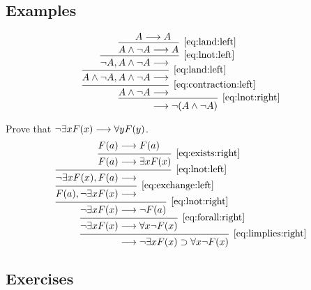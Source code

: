 \documentclass[11pt,a4paper]{article}
\begin{document}
\subsection{Examples}

\begin{example}[A proof in \LJ]\label{exa:a proof in LJ}
    \begin{equation*}
        \begin{prooftree}
            \hypo{A\seq A}
            \infer1[\eqref{eq:land:left}]{A\land\lnot A&\seq A}
            \infer1[\eqref{eq:lnot:left}]{\lnot A, A\land\lnot A&\seq}
            \infer1[\eqref{eq:land:left}]{A\land\lnot A, A\land\lnot A&\seq}
            \infer1[\eqref{eq:contraction:left}]{A\land\lnot A&\seq}
            \infer1[\eqref{eq:lnot:right}]{&\seq \lnot\arcs{A\land\lnot A}}
        \end{prooftree}
    \end{equation*}
\end{example}

\begin{example}\label{exa:another proof in LJ}
    Prove that \(\lnot\exists xF(x)\longrightarrow\forall yF(y)\).
    \begin{equation*}
        \begin{prooftree}
            \hypo{F(a)&\seq F(a)}
            \infer1[\eqref{eq:exists:right}]{F(a)&\seq\exists xF(x)}
            \infer1[\eqref{eq:lnot:left}]{\lnot\exists xF(x), F(a)&\seq}
            \infer1[\eqref{eq:exchange:left}]{F(a), \lnot\exists xF(x)&\seq}
            \infer1[\eqref{eq:lnot:right}]{\lnot\exists xF(x)&\seq \lnot F(a)}
            \infer1[\eqref{eq:forall:right}]{\lnot\exists xF(x)&\seq \forall x\lnot F(x)}
            \infer1[\eqref{eq:limplies:right}]{&\seq \lnot\exists xF(x)\limplies\forall x\lnot F(x)}
        \end{prooftree}
    \end{equation*}
\end{example}

\subsection{Exercises}
\end{document}
